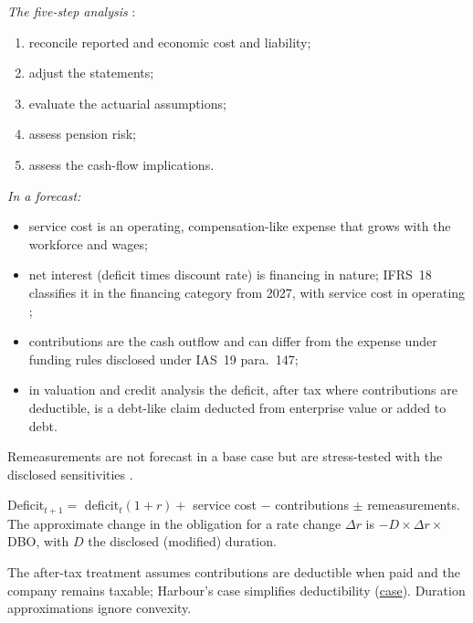 \begin{qfmethod}\label{meth:post-employment-benefit-modelling}
 \emph{The five-step analysis} \citep[pp.~163--166]{financial-statement-analysis-2009}:
\begin{enumerate}
\item reconcile reported and economic cost and liability;
\item adjust the statements;
\item evaluate the actuarial assumptions;
\item assess pension risk;
\item assess the cash-flow implications.
\end{enumerate}

\emph{In a forecast:}
\begin{itemize}
\item service cost is an operating, compensation-like expense that grows with the workforce and wages;
\item net interest (deficit times discount rate) is financing in nature; IFRS~18 classifies it in the financing category from 2027, with service cost in operating \citep[Annex, IFRS~18 paras.~B53--B55]{eu-2026-338-ifrs18};
\item contributions are the cash outflow and can differ from the expense under funding rules disclosed under IAS~19 para.~147;
\item in valuation and credit analysis the deficit, after tax where contributions are deductible, is a debt-like claim deducted from enterprise value or added to debt.
\end{itemize}
Remeasurements are not forecast in a base case but are stress-tested with the disclosed sensitivities \citep[IAS~19 para.~145]{eu-2023-1803-ias19}.

 Deficit$_{t+1}=$ deficit$_t(1+r)+$ service cost $-$ contributions $\pm$ remeasurements. The approximate change in the obligation for a rate change $\Delta r$ is $-D\times\Delta r\times$DBO, with $D$ the disclosed (modified) duration.

 The after-tax treatment assumes contributions are deductible when paid and the company remains taxable; Harbour's case simplifies deductibility (\hyperref[ex:harbour-tools-statements]{case}). Duration approximations ignore convexity.


\end{qfmethod}
